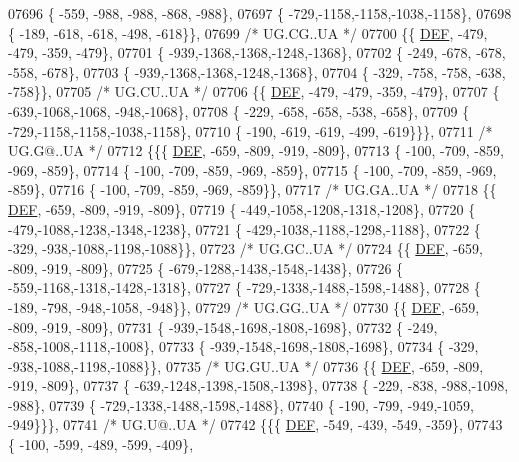 \begin{DoxyCode}
07696 \{ -559, -988, -988, -868, -988\},
07697 \{ -729,-1158,-1158,-1038,-1158\},
07698 \{ -189, -618, -618, -498, -618\}\},
07699 \textcolor{comment}{/* UG.CG..UA */}
07700 \{\{  \mbox{\hyperlink{1_88_84__epars_8h_a397419fc12b37ed479c8abb9d444d843}{DEF}}, -479, -479, -359, -479\},
07701 \{ -939,-1368,-1368,-1248,-1368\},
07702 \{ -249, -678, -678, -558, -678\},
07703 \{ -939,-1368,-1368,-1248,-1368\},
07704 \{ -329, -758, -758, -638, -758\}\},
07705 \textcolor{comment}{/* UG.CU..UA */}
07706 \{\{  \mbox{\hyperlink{1_88_84__epars_8h_a397419fc12b37ed479c8abb9d444d843}{DEF}}, -479, -479, -359, -479\},
07707 \{ -639,-1068,-1068, -948,-1068\},
07708 \{ -229, -658, -658, -538, -658\},
07709 \{ -729,-1158,-1158,-1038,-1158\},
07710 \{ -190, -619, -619, -499, -619\}\}\},
07711 \textcolor{comment}{/* UG.G@..UA */}
07712 \{\{\{  \mbox{\hyperlink{1_88_84__epars_8h_a397419fc12b37ed479c8abb9d444d843}{DEF}}, -659, -809, -919, -809\},
07713 \{ -100, -709, -859, -969, -859\},
07714 \{ -100, -709, -859, -969, -859\},
07715 \{ -100, -709, -859, -969, -859\},
07716 \{ -100, -709, -859, -969, -859\}\},
07717 \textcolor{comment}{/* UG.GA..UA */}
07718 \{\{  \mbox{\hyperlink{1_88_84__epars_8h_a397419fc12b37ed479c8abb9d444d843}{DEF}}, -659, -809, -919, -809\},
07719 \{ -449,-1058,-1208,-1318,-1208\},
07720 \{ -479,-1088,-1238,-1348,-1238\},
07721 \{ -429,-1038,-1188,-1298,-1188\},
07722 \{ -329, -938,-1088,-1198,-1088\}\},
07723 \textcolor{comment}{/* UG.GC..UA */}
07724 \{\{  \mbox{\hyperlink{1_88_84__epars_8h_a397419fc12b37ed479c8abb9d444d843}{DEF}}, -659, -809, -919, -809\},
07725 \{ -679,-1288,-1438,-1548,-1438\},
07726 \{ -559,-1168,-1318,-1428,-1318\},
07727 \{ -729,-1338,-1488,-1598,-1488\},
07728 \{ -189, -798, -948,-1058, -948\}\},
07729 \textcolor{comment}{/* UG.GG..UA */}
07730 \{\{  \mbox{\hyperlink{1_88_84__epars_8h_a397419fc12b37ed479c8abb9d444d843}{DEF}}, -659, -809, -919, -809\},
07731 \{ -939,-1548,-1698,-1808,-1698\},
07732 \{ -249, -858,-1008,-1118,-1008\},
07733 \{ -939,-1548,-1698,-1808,-1698\},
07734 \{ -329, -938,-1088,-1198,-1088\}\},
07735 \textcolor{comment}{/* UG.GU..UA */}
07736 \{\{  \mbox{\hyperlink{1_88_84__epars_8h_a397419fc12b37ed479c8abb9d444d843}{DEF}}, -659, -809, -919, -809\},
07737 \{ -639,-1248,-1398,-1508,-1398\},
07738 \{ -229, -838, -988,-1098, -988\},
07739 \{ -729,-1338,-1488,-1598,-1488\},
07740 \{ -190, -799, -949,-1059, -949\}\}\},
07741 \textcolor{comment}{/* UG.U@..UA */}
07742 \{\{\{  \mbox{\hyperlink{1_88_84__epars_8h_a397419fc12b37ed479c8abb9d444d843}{DEF}}, -549, -439, -549, -359\},
07743 \{ -100, -599, -489, -599, -409\},

\end{DoxyCode}
